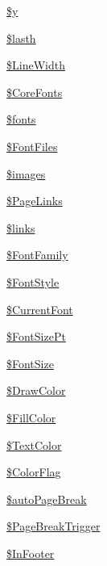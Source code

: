 \begin{DoxyCompactItemize}
\item 
\hyperlink{classm_p_d_f_a083c8994b04d6fd5cc7c8e59b46056b4}{\$y}
\item 
\hyperlink{classm_p_d_f_a58c5820a6b4c747b368a2af036e5e252}{\$lasth}
\item 
\hyperlink{classm_p_d_f_a420b684001b9cdc610695aab6f8a61e9}{\$\-Line\-Width}
\item 
\hyperlink{classm_p_d_f_a64b04c801128bf756c230f7d82bca3e7}{\$\-Core\-Fonts}
\item 
\hyperlink{classm_p_d_f_acfe6b2d9106432b65e97a383d870b94d}{\$fonts}
\item 
\hyperlink{classm_p_d_f_a792819043f0aa35f8c370aa5e8d9f4c5}{\$\-Font\-Files}
\item 
\hyperlink{classm_p_d_f_a543c6380782deda4105cbdc2abc1794f}{\$images}
\item 
\hyperlink{classm_p_d_f_a6cabe4ae2977e4c2032b2005104e30aa}{\$\-Page\-Links}
\item 
\hyperlink{classm_p_d_f_a0eaa65f03f86406b3bfd3a7bcbcb4028}{\$links}
\item 
\hyperlink{classm_p_d_f_a1c1c461eafab6a8d03e8cfee9a41a211}{\$\-Font\-Family}
\item 
\hyperlink{classm_p_d_f_a9eb5f21f34b2cf8a4d0045a7923bc87c}{\$\-Font\-Style}
\item 
\hyperlink{classm_p_d_f_a2dcd428ca1be1f6e6400a3c35ecd7a11}{\$\-Current\-Font}
\item 
\hyperlink{classm_p_d_f_a1d88cfab00ee90cdd71d9060c0a08e4a}{\$\-Font\-Size\-Pt}
\item 
\hyperlink{classm_p_d_f_a4e76010241061259c347975e690dcb06}{\$\-Font\-Size}
\item 
\hyperlink{classm_p_d_f_a9b19d09d28bf66f2f8222c40a096d1ea}{\$\-Draw\-Color}
\item 
\hyperlink{classm_p_d_f_ae84c947b6cd2d37e030737806870860c}{\$\-Fill\-Color}
\item 
\hyperlink{classm_p_d_f_afcbd654719f8e5179947d1afd7a3245c}{\$\-Text\-Color}
\item 
\hyperlink{classm_p_d_f_aa4fae815bd6a6a8ab4efba4c9949e189}{\$\-Color\-Flag}
\item 
\hyperlink{classm_p_d_f_a8e3bc3d1ebf06e10578694b30960b569}{\$auto\-Page\-Break}
\item 
\hyperlink{classm_p_d_f_a93ac521ff21aa18b70e70656b93cab10}{\$\-Page\-Break\-Trigger}
\item 
\hyperlink{classm_p_d_f_a517528690e5aa048b1fd2af8bdddb451}{\$\-In\-Footer}
\item 

\end{DoxyCompactItemize}
